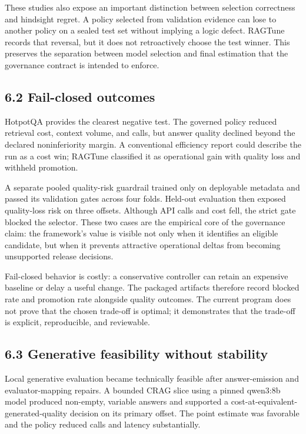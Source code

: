 \documentclass[11pt]{article}
\begin{document}
These studies also expose an important distinction between selection correctness and hindsight regret. A policy selected from validation evidence can lose to another policy on a sealed test set without implying a logic defect. RAGTune records that reversal, but it does not retroactively choose the test winner. This preserves the separation between model selection and final estimation that the governance contract is intended to enforce.

\subsection{6.2 Fail-closed outcomes}
HotpotQA provides the clearest negative test. The governed policy reduced retrieval cost, context volume, and calls, but answer quality declined beyond the declared noninferiority margin. A conventional efficiency report could describe the run as a cost win; RAGTune classified it as operational gain with quality loss and withheld promotion.

A separate pooled quality-risk guardrail trained only on deployable metadata and passed its validation gates across four folds. Held-out evaluation then exposed quality-loss risk on three offsets. Although API calls and cost fell, the strict gate blocked the selector. These two cases are the empirical core of the governance claim: the framework's value is visible not only when it identifies an eligible candidate, but when it prevents attractive operational deltas from becoming unsupported release decisions.

Fail-closed behavior is costly: a conservative controller can retain an expensive baseline or delay a useful change. The packaged artifacts therefore record blocked rate and promotion rate alongside quality outcomes. The current program does not prove that the chosen trade-off is optimal; it demonstrates that the trade-off is explicit, reproducible, and reviewable.

\subsection{6.3 Generative feasibility without stability}
Local generative evaluation became technically feasible after answer-emission and evaluator-mapping repairs. A bounded CRAG slice using a pinned qwen3:8b model produced non-empty, variable answers and supported a cost-at-equivalent-generated-quality decision on its primary offset. The point estimate was favorable and the policy reduced calls and latency substantially.
\end{document}
